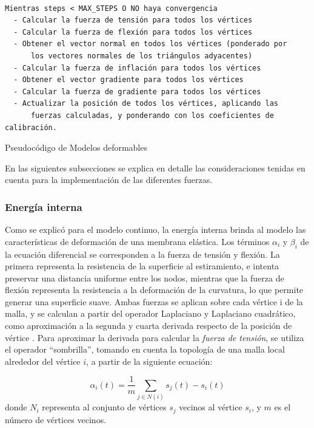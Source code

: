 \begin{program}
\begin{verbatim}

Mientras steps < MAX_STEPS O NO haya convergencia
  - Calcular la fuerza de tensión para todos los vértices
  - Calcular la fuerza de flexión para todos los vértices
  - Obtener el vector normal en todos los vértices (ponderado por 
      los vectores normales de los triángulos adyacentes)
  - Calcular la fuerza de inflación para todos los vértices
  - Obtener el vector gradiente para todos los vértices
  - Calcular la fuerza de gradiente para todos los vértices
  - Actualizar la posición de todos los vértices, aplicando las 
      fuerzas calculadas, y ponderando con los coeficientes de calibración.
\end{verbatim}
\caption{Pseudocódigo de Modelos deformables}
\label{alg:modelos_deformables}
\end{program}

En las siguientes subsecciones se explica en detalle las consideraciones tenidas en cuenta para la implementación de las diferentes fuerzas.

\subsubsection{Energía interna}\label{section:energia_interna}
Como se explicó para el modelo continuo, la energía interna brinda al modelo las características de deformación de una membrana elástica. Los términos $\alpha_{i}$ y $\beta_{i}$ de la ecuación diferencial se corresponden a la fuerza de tensión y flexión. La primera representa la resistencia de la superficie al estiramiento, e intenta preservar una distancia uniforme entre los nodos, mientras que la fuerza de flexión representa la resistencia a la deformación de la curvatura, lo que permite generar una superficie suave. Ambas fuerzas se aplican sobre cada vértice i de la malla, y se calculan a partir del operador Laplaciano y Laplaciano cuadrático, como aproximación a la segunda y cuarta derivada respecto de la posición de vértice \citep{mcinerney2000t}. Para aproximar la derivada para calcular la \emph{fuerza de tensión}, se utiliza el operador “sombrilla”, tomando en cuenta la topología de una malla local alrededor del vértice $i$, a partir de la siguiente ecuación:

%
\begin{equation}
\alpha_{i}(t) = \dfrac{1}{m}\sum_{j\in N(i)} s_{j}(t) - s_{i}(t)
\end{equation}
%
donde $N_{i}$ representa al conjunto de vértices $s_{j}$ vecinos al vértice $s_{i}$, y $m$ es el número de vértices  vecinos.

